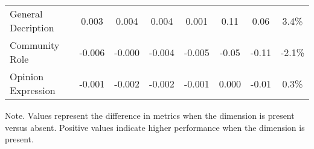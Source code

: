 \begin{table}
\begin{tabular}{lccccccc}
General Decription & 0.003 & 0.004 & 0.004 & 0.001 & 0.11 & 0.06 & 3.4\% \\
Community Role & -0.006 & -0.000 & -0.004 & -0.005 & -0.05 & -0.11 & -2.1\% \\
Opinion Expression & -0.001 & -0.002 & -0.002 & -0.001 & 0.000 & -0.01 & 0.3\% \\
\hline
\end{tabular}
\begin{tablenotes}
\small
\item Note. Values represent the difference in metrics when the dimension is present versus absent. Positive values indicate higher performance when the dimension is present.
\end{tablenotes}
\end{table}